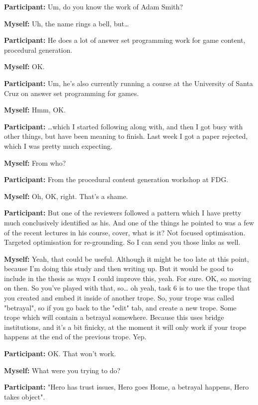 \documentclass[11pt]{report}
\begin{document}
\begin{linenumbers}
\textbf{Participant:} Um, do you know the work of Adam Smith?

\textbf{Myself:} Uh, the name rings a bell, but\ldots{}

\textbf{Participant:} He does a lot of answer set programming work for game content, procedural generation.

\textbf{Myself:} OK.

\textbf{Participant:} Um, he's also currently running a course at the University of Santa Cruz on answer set programming for games.

\textbf{Myself:} Hmm, OK.

\textbf{Participant:} \ldots{}which I started following along with, and then I got busy with other things, but have been meaning to finish. Last week I got a paper rejected, which I was pretty much expecting.

\textbf{Myself:} From who?

\textbf{Participant:} From the procedural content generation workshop at FDG.

\textbf{Myself:} Oh, OK, right. That's a shame.

\textbf{Participant:} But one of the reviewers followed a pattern which I have pretty much conclusively identified as his. And one of the things he pointed to was a few of the recent lectures in his course, cover, what is it? Not focused optimisation. Targeted optimisation for re-grounding. So I can send you those links as well.

\textbf{Myself:} Yeah, that could be useful. Although it might be too late at this point, because I'm doing this study and then writing up. But it would be good to include in the thesis as ways I could improve this, yeah. For sure. OK, so moving on then. So you've played with that, so\ldots{} oh yeah, task 6 is to use the trope that you created and embed it inside of another trope. So, your trope was called "betrayal", so if you go back to the "edit" tab, and create a new trope. Some trope which will contain a betrayal somewhere. Because this uses bridge institutions, and it's a bit finicky, at the moment it will only work if your trope happens at the end of the previous trope. Yep.

\textbf{Participant:} OK. That won't work.

\textbf{Myself:} What were you trying to do?

\textbf{Participant:} "Hero has trust issues, Hero goes Home, a betrayal
happens, Hero takes object".


\end{linenumbers}
\end{document}

